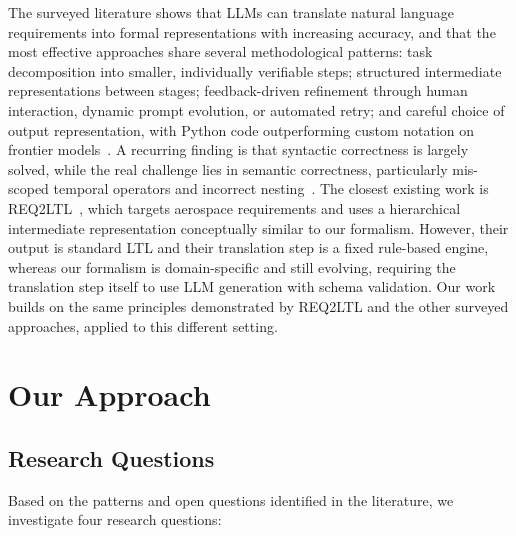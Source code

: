 The surveyed literature shows that LLMs can translate natural language
requirements into formal representations with increasing accuracy, and
that the most effective approaches share several methodological patterns:
task decomposition into smaller, individually verifiable steps; structured
intermediate representations between stages; feedback-driven refinement
through human interaction, dynamic prompt evolution, or automated retry;
and careful choice of output representation, with Python code
outperforming custom notation on frontier
models~\cite{danso2026syntax,gao2022pal}. A recurring finding is that
syntactic correctness is largely solved, while the real challenge lies in
semantic correctness, particularly mis-scoped temporal operators and
incorrect nesting~\cite{danso2026syntax,ma2025req2ltl}. The closest
existing work is REQ2LTL~\cite{ma2025req2ltl}, which targets aerospace
requirements and uses a hierarchical intermediate representation
conceptually similar to our formalism. However, their output is standard
LTL and their translation step is a fixed rule-based engine, whereas our
formalism is domain-specific and still evolving, requiring the
translation step itself to use LLM generation with schema validation. Our
work builds on the same principles demonstrated by REQ2LTL and the other
surveyed approaches, applied to this different setting.


\section{Our Approach}
\label{sec:approach}

\subsection{Research Questions}
\label{sec:rqs}

Based on the patterns and open questions identified in the literature, we
investigate four research questions:

